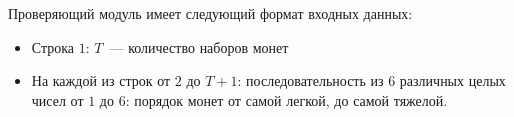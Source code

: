 Проверяющий модуль имеет следующий формат входных данных:
\begin{itemize}
\item Строка $1$: $T$~--- количество наборов монет
\item На каждой из строк от $2$ до $T + 1$: последовательность из $6$ различных целых чисел от $1$
до $6$: порядок монет от самой легкой, до самой тяжелой.
\end{itemize}

